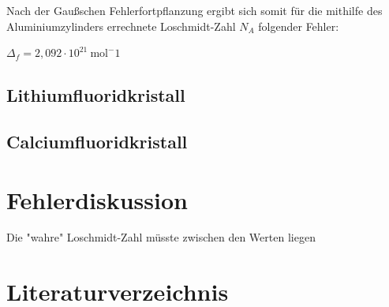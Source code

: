 \documentclass[12pt,a4paper,titlepage,headinclude,bibtotoc]{scrartcl}
\begin{document}
Nach der Gaußschen Fehlerfortpflanzung ergibt sich somit für die mithilfe des Aluminiumzylinders errechnete Loschmidt-Zahl $N_A$ folgender Fehler:\\

\vspace{3mm}

$\Delta_f = 2,092\cdot10^{21}\ \mathrm{mol^-1}$








\subsection{Lithiumfluoridkristall}
\subsection{Calciumfluoridkristall}

\section{Fehlerdiskussion}
Die "wahre" Loschmidt-Zahl müsste zwischen den Werten liegen 


\section{Literaturverzeichnis}
\end{document}
